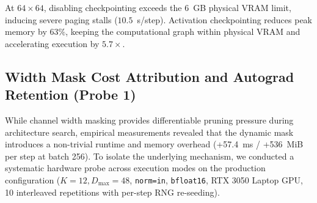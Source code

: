 \documentclass[11pt, a4paper]{article}
\begin{document}
\begin{table}[h]
\centering
\caption{\textbf{Hardware Profile Across Checkpointing Configurations.} Measured at batch size 256 in \texttt{bfloat16}.}
\label{tab:ablation_systems}
\small
{}
\end{table}

At $64 \times 64$, disabling checkpointing exceeds the 6~GB physical VRAM limit, inducing severe paging stalls ($10.5$~s/step). Activation checkpointing reduces peak memory by $63\%$, keeping the computational graph within physical VRAM and accelerating execution by $5.7\times$.

\subsection{Width Mask Cost Attribution and Autograd Retention (Probe 1)}
\label{sec:mask_attribution}

While channel width masking provides differentiable pruning pressure during architecture search, empirical measurements revealed that the dynamic mask introduces a non-trivial runtime and memory overhead (+57.4~ms / +536~MiB per step at batch 256). To isolate the underlying mechanism, we conducted a systematic hardware probe across execution modes on the production configuration ($K=12, D_{\max}=48$, \texttt{norm=in}, \texttt{bfloat16}, RTX 3050 Laptop GPU, 10 interleaved repetitions with per-step RNG re-seeding).
\end{document}
